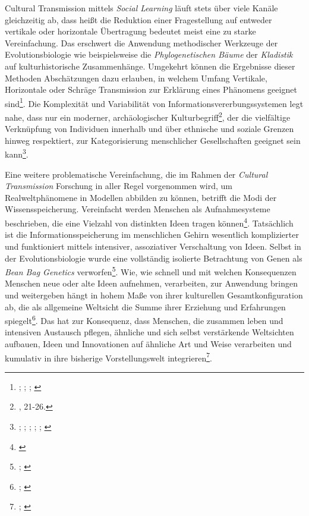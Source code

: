 \documentclass[openany,twoside,twocolumn]{book}
\let\rmarkdownfootnote\footnote%
\def\footnote{\protect\rmarkdownfootnote}
\begin{document}
Cultural Transmission mittels \emph{Social Learning} läuft stets über
viele Kanäle gleichzeitig ab, dass heißt die Reduktion einer
Fragestellung auf entweder vertikale oder horizontale Übertragung
bedeutet meist eine zu starke Vereinfachung. Das erschwert die Anwendung
methodischer Werkzeuge der Evolutionsbiologie wie beispielsweise die
\emph{Phylogenetischen Bäume} der \emph{Kladistik} auf kulturhistorische
Zusammenhänge. Umgekehrt können die Ergebnisse dieser Methoden
Abschätzungen dazu erlauben, in welchem Umfang Vertikale, Horizontale
oder Schräge Transmission zur Erklärung eines Phänomens geeignet
sind\footnote{\textcite{jordan_cultural_2003};
  \textcite{mcclure_cultural_2004}; \textcite{mcclure_gender_2007};
  \textcite{tehrani_investigating_2002}}. Die Komplexität und
Variabilität von Informationsvererbungssystemen legt nahe, dass nur ein
moderner, archäologischer Kulturbegriff\footnote{\textcite{furholt_nordlichen_2009},
  21-26.}, der die vielfältige Verknüpfung von Individuen innerhalb und
über ethnische und soziale Grenzen hinweg respektiert, zur
Kategorisierung menschlicher Gesellschaften geeignet sein kann\footnote{\textcite{lipo_science_2001};
  \textcite{lipo_population_1997}; \textcite{palmer_tools_2005};
  \textcite{palmer_cultural_1995-1}; \textcite{palmer_categories_1997};
  \textcite{mcelreath_shared_2003}}.

Eine weitere problematische Vereinfachung, die im Rahmen der
\emph{Cultural Transmission} Forschung in aller Regel vorgenommen wird,
um Realweltphänomene in Modellen abbilden zu können, betrifft die Modi
der Wissensspeicherung. Vereinfacht werden Menschen als Aufnahmesysteme
beschrieben, die eine Vielzahl von distinkten Ideen tragen
können\footnote{\textcite{mithen_cognitive_1997}}. Tatsächlich ist die
Informationsspeicherung im menschlichen Gehirn wesentlich komplizierter
und funktioniert mittels intensiver, assoziativer Verschaltung von
Ideen. Selbst in der Evolutionsbiologie wurde eine vollständig isolierte
Betrachtung von Genen als \emph{Bean Bag Genetics} verworfen\footnote{\textcite{de_winter_beanbag_1997};
  \textcite{mayr_where_1959}}. Wie, wie schnell und mit welchen
Konsequenzen Menschen neue oder alte Ideen aufnehmen, verarbeiten, zur
Anwendung bringen und weitergeben hängt in hohem Maße von ihrer
kulturellen Gesamtkonfiguration ab, die als allgemeine Weltsicht die
Summe ihrer Erziehung und Erfahrungen spiegelt\footnote{\textcite{gabora_ideas_2004};
  \textcite{sperber_explaining_1996}}. Das hat zur Konsequenz, dass
Menschen, die zusammen leben und intensiven Austausch pflegen, ähnliche
und sich selbst verstärkende Weltsichten aufbauen, Ideen und
Innovationen auf ähnliche Art und Weise verarbeiten und kumulativ in
ihre bisherige Vorstellungswelt integrieren\footnote{\textcite{eerkens_cultural_2007};
  \textcite{basalla_evolution_1988}}.
\end{document}
